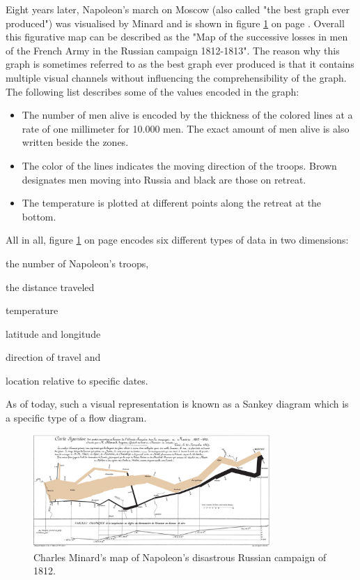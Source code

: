 Eight years later, Napoleon's march on Moscow (also called "the best graph ever produced") was visualised by Minard and is shown in figure \ref{fig:minard2} on page \pageref{fig:minard2}. Overall this figurative map can be described as the "Map of the successive losses in men of the French Army in the Russian campaign 1812-1813". The reason why this graph is sometimes referred to as the best graph ever produced is that it contains multiple visual channels without influencing the comprehensibility of the graph. The following list describes some of the values encoded in the graph:
\begin{itemize}
\item The number of men alive is encoded by the thickness of the colored lines at a rate of one millimeter for 10.000 men. The exact amount of men alive is also written beside the zones.
\item The color of the lines indicates the moving direction of the troops. Brown designates men moving into Russia and black are those on retreat.
\item The temperature is plotted at different points along the retreat at the bottom.
\end{itemize}
All in all, figure \ref{fig:minard2} on page \pageref{fig:minard2} encodes six different types of data in two dimensions:
\begin{enumerate*}[label={(\arabic*)}]
\item the number of Napoleon's troops,
\item the distance traveled
\item temperature
\item latitude and longitude
\item direction of travel and
\item location relative to specific dates.
\end{enumerate*}
As of today, such a visual representation is known as a Sankey diagram which is a specific type of a flow diagram.

\begin{figure}[!htb]
\centering
\includegraphics[width=0.8\textwidth,keepaspectratio]{images/history/minard2.png}
\caption[
    Charles Minard's map of Napoleon's disastrous Russian campaign of 1812., Urldate: 07.2016 \newline
\small\texttt{\url{https://upload.wikimedia.org/wikipedia/commons/2/29/Minard.png}}
]{Charles Minard's map of Napoleon's disastrous Russian campaign of 1812.}
\label{fig:minard2}
\end{figure}

